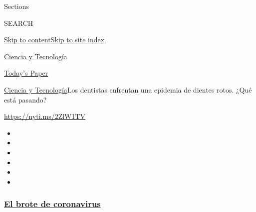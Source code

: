 Sections

SEARCH

\protect\hyperlink{site-content}{Skip to
content}\protect\hyperlink{site-index}{Skip to site index}

\href{https://www.nytimes3xbfgragh.onion/es/section/ciencia-y-tecnologia}{Ciencia
y Tecnología}

\href{https://myaccount.nytimes3xbfgragh.onion/auth/login?response_type=cookie\&client_id=vi}{}

\href{https://www.nytimes3xbfgragh.onion/section/todayspaper}{Today's
Paper}

\href{/es/section/ciencia-y-tecnologia}{Ciencia y
Tecnología}\textbar{}Los dentistas enfrentan una epidemia de dientes
rotos. ¿Qué está pasando?

\url{https://nyti.ms/2ZlW1TV}

\begin{itemize}
\item
\item
\item
\item
\item
\item
\end{itemize}

\hypertarget{el-brote-de-coronavirus}{%
\subsubsection{\texorpdfstring{\href{https://www.nytimes3xbfgragh.onion/es/spotlight/coronavirus?name=styln-coronavirus-es\&region=TOP_BANNER\&block=storyline_menu_recirc\&action=click\&pgtype=Article\&impression_id=36a4d0b0-f283-11ea-8f04-735a2495ff97\&variant=undefined}{El
brote de
coronavirus}}{El brote de coronavirus}}\label{el-brote-de-coronavirus}}

